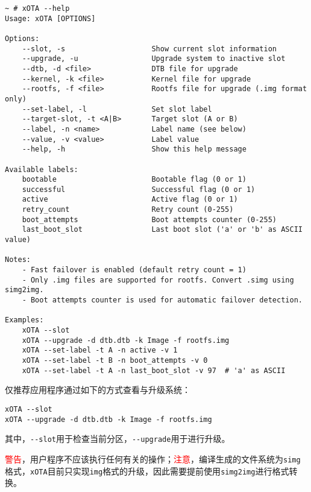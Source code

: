 \documentclass[UTF8]{ctexart}
\newcommand{\code}[1]{\colorbox{gray!10}{\lstinline[style=inlinecode]|#1|}}
\begin{document}
\begin{lstlisting}
~ # xOTA --help
Usage: xOTA [OPTIONS]

Options:
    --slot, -s                    Show current slot information
    --upgrade, -u                 Upgrade system to inactive slot
    --dtb, -d <file>              DTB file for upgrade
    --kernel, -k <file>           Kernel file for upgrade
    --rootfs, -f <file>           Rootfs file for upgrade (.img format only)
    --set-label, -l               Set slot label
    --target-slot, -t <A|B>       Target slot (A or B)
    --label, -n <name>            Label name (see below)
    --value, -v <value>           Label value
    --help, -h                    Show this help message

Available labels:
    bootable                      Bootable flag (0 or 1)
    successful                    Successful flag (0 or 1)
    active                        Active flag (0 or 1)
    retry_count                   Retry count (0-255)
    boot_attempts                 Boot attempts counter (0-255)
    last_boot_slot                Last boot slot ('a' or 'b' as ASCII value)

Notes:
    - Fast failover is enabled (default retry count = 1)
    - Only .img files are supported for rootfs. Convert .simg using simg2img.
    - Boot attempts counter is used for automatic failover detection.

Examples:
    xOTA --slot
    xOTA --upgrade -d dtb.dtb -k Image -f rootfs.img
    xOTA --set-label -t A -n active -v 1
    xOTA --set-label -t B -n boot_attempts -v 0
    xOTA --set-label -t A -n last_boot_slot -v 97  # 'a' as ASCII    
\end{lstlisting}

仅推荐应用程序通过如下的方式查看与升级系统：

\begin{lstlisting}
xOTA --slot
xOTA --upgrade -d dtb.dtb -k Image -f rootfs.img
\end{lstlisting}

\noindent 其中，\code{--slot}用于检查当前分区，\code{--upgrade}用于进行升级。

\textcolor{red}{警告}，用户程序不应该执行任何有关的操作；\textcolor{red}{注意}，编译生成的文件系统为\code{simg}格式，\code{xOTA}目前只实现\code{img}格式的升级，因此需要提前使用\code{simg2img}进行格式转换。

\end{document}
